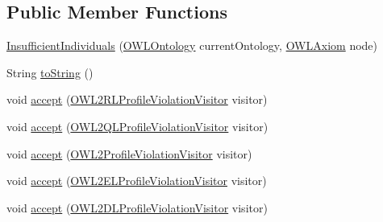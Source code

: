 \subsection*{Public Member Functions}
\begin{DoxyCompactItemize}
\item 
\hyperlink{classorg_1_1semanticweb_1_1owlapi_1_1profiles_1_1_insufficient_individuals_a7845cd38e648d45c02b7d8f5c1b6b454}{Insufficient\-Individuals} (\hyperlink{interfaceorg_1_1semanticweb_1_1owlapi_1_1model_1_1_o_w_l_ontology}{O\-W\-L\-Ontology} current\-Ontology, \hyperlink{interfaceorg_1_1semanticweb_1_1owlapi_1_1model_1_1_o_w_l_axiom}{O\-W\-L\-Axiom} node)
\item 
String \hyperlink{classorg_1_1semanticweb_1_1owlapi_1_1profiles_1_1_insufficient_individuals_aa3b1b59a735a807eee74f9dd50e9cc9e}{to\-String} ()
\item 
void \hyperlink{classorg_1_1semanticweb_1_1owlapi_1_1profiles_1_1_insufficient_individuals_a755fcfab3bdc5cb3002315d1520828f8}{accept} (\hyperlink{interfaceorg_1_1semanticweb_1_1owlapi_1_1profiles_1_1_o_w_l2_r_l_profile_violation_visitor}{O\-W\-L2\-R\-L\-Profile\-Violation\-Visitor} visitor)
\item 
void \hyperlink{classorg_1_1semanticweb_1_1owlapi_1_1profiles_1_1_insufficient_individuals_a60f062dfe613d41bb0f1dda0f3cd33ca}{accept} (\hyperlink{interfaceorg_1_1semanticweb_1_1owlapi_1_1profiles_1_1_o_w_l2_q_l_profile_violation_visitor}{O\-W\-L2\-Q\-L\-Profile\-Violation\-Visitor} visitor)
\item 
void \hyperlink{classorg_1_1semanticweb_1_1owlapi_1_1profiles_1_1_insufficient_individuals_a798ed90604673b31af6f1383c77a31a4}{accept} (\hyperlink{interfaceorg_1_1semanticweb_1_1owlapi_1_1profiles_1_1_o_w_l2_profile_violation_visitor}{O\-W\-L2\-Profile\-Violation\-Visitor} visitor)
\item 
void \hyperlink{classorg_1_1semanticweb_1_1owlapi_1_1profiles_1_1_insufficient_individuals_ace467aac8e22bbc717bd539a3beb7969}{accept} (\hyperlink{interfaceorg_1_1semanticweb_1_1owlapi_1_1profiles_1_1_o_w_l2_e_l_profile_violation_visitor}{O\-W\-L2\-E\-L\-Profile\-Violation\-Visitor} visitor)
\item 
void \hyperlink{classorg_1_1semanticweb_1_1owlapi_1_1profiles_1_1_insufficient_individuals_a2b611c3b620f01e2d2cefd4274a267ec}{accept} (\hyperlink{interfaceorg_1_1semanticweb_1_1owlapi_1_1profiles_1_1_o_w_l2_d_l_profile_violation_visitor}{O\-W\-L2\-D\-L\-Profile\-Violation\-Visitor} visitor)
\end{DoxyCompactItemize}


